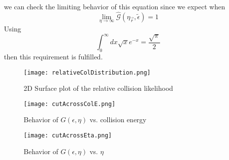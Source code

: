 we can check the limiting behavior of this equation since we expect when 
\begin{equation}
	\lim_{\eta \rightarrow \infty} \hat{\mathcal{G}}(\eta_{\vec{r}}, \tilde{\epsilon}) = 1 
\end{equation}
Using
\begin{equation}
	\int_0^{\infty} dx \sqrt{x} e^{-x} = \frac{\sqrt{\pi}}{2}
\end{equation}
then this requirement is fulfilled. 


\begin{figure}
\label{fig:momSurfRelCol}
	\centerline{
	\texttt{[image: relativeColDistribution.png]}}
	\caption{2D Surface plot of the relative collision likelihood}{}
\end{figure} 

\begin{figure}
\label{fig:relColvsColE}
	\centerline{
	\texttt{[image: cutAcrossColE.png]}}
	\caption{Behavior of $G(\epsilon,\eta)$ vs. collision energy}{}
\end{figure} 

\begin{figure}
\label{fig:relColvsEta}
	\centerline{
	\texttt{[image: cutAcrossEta.png]}}
	\caption{Behavior of $G(\epsilon,\eta)$ vs. $\eta$}{}
\end{figure} 